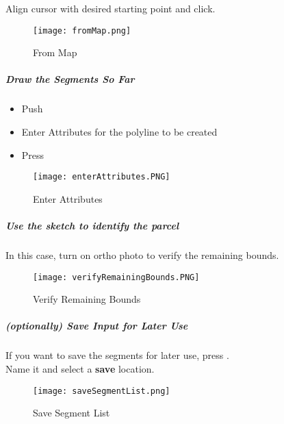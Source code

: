 \noindent Align cursor with desired starting point and click.
\begin{figure}[H]
\centering
    \texttt{[image: fromMap.png]}
\vspace{-.1in}

\caption{From Map}
\end{figure}

\clearpage

\subparagraph*{Draw the Segments So Far}

\begin{itemize}
\item Push \textbf{}
\item Enter Attributes for the polyline to be created
\item Press \textbf{}
\end{itemize}

\begin{figure}[H]
\centering
    \texttt{[image: enterAttributes.PNG]}
\vspace{-.1in}

\caption{Enter Attributes}
\end{figure}

\clearpage

\subparagraph*{Use the sketch to identify the parcel\\}

In this case, turn on ortho photo to verify the remaining bounds.

\begin{figure}[H]
\centering
    \texttt{[image: verifyRemainingBounds.PNG]}
\vspace{-.1in}

\caption{Verify Remaining Bounds}
\end{figure}

\subparagraph*{(optionally) Save Input for Later Use\\}

If you want to save the segments for later use, press \textbf{}.\\

\noindent Name it and select a \textbf{save} location.

\begin{figure}[H]
\centering
    \texttt{[image: saveSegmentList.png]}
\vspace{-.2in}

\caption{Save Segment List}
\end{figure}

